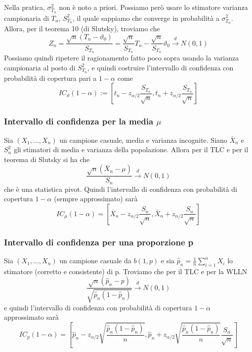 Nella pratica, $\sigma^2_{T_n}$ non è noto a priori. Possiamo però usare lo stimatore varianza campionaria di $T_n$, $S^2_{T_n}$, il quale sappiamo che converge in probabilità a $\sigma^2_{T_n}$. Allora, per il teorema 10 (di Slutsky), troviamo che 
$$Z_n=\frac{\sqrt{n}(T_n - \vartheta_0)}{S_{T_n}} = \frac{\sqrt{n}}{S_{T_n}} T_n - \frac{\sqrt{n}}{S_{T_n}} \vartheta_0 \stackrel{d}{\rightarrow}N(0,1)$$ Possiamo quindi ripetere il ragionamento fatto poco sopra usando la varianza campionaria al posto di $S^2_{T_n}$, e quindi costruire l'intervallo di confidenza con probabilità di copertura pari a $1 - \alpha$ come $$IC_\vartheta (1-\alpha) := \left[t_n - z_{\alpha / 2} \frac{S_{T_n}}{\sqrt{n}}, t_n + z_{\alpha / 2} \frac{S_{T_n}}{\sqrt{n}}\right]$$
\subsubsection{Intervallo di confidenza per la media $\mu$}
Sia $(X_1,...,X_n)$ un campione casuale, media e varianza incognite. Siano $\bar{X}_n$ e $S^2_n$ gli stimatori di media e varianza della popolazione. Allora per il TLC e per il teorema di Slutsky si ha che 
$$\frac{\sqrt{n}(\bar{X}_n - \mu)}{S_n} \stackrel{d}{\rightarrow}N(0,1)$$
che è una statistica pivot. Quindi l'intervallo di confidenza con probabilità di copertura $1-\alpha$ (sempre approssimato) sarà
$$IC_\mu(1-\alpha)=\left[\bar{X}_n - z_{\alpha / 2} \frac{S_n}{\sqrt{n}}, \bar{X}_n + z_{\alpha / 2} \frac{S_n}{\sqrt{n}}\right]$$
\subsubsection{Intervallo di confidenza per una proporzione p}
Sia $(X_1,...,X_n)$ un campione casuale da $b(1,p)$ e sia $\hat{p}_n=\frac{1}{n} \sum_{i=1}^n X_i$ lo stimatore (corretto e consistente) di p. Troviamo che per il TLC e per la WLLN $$\frac{\sqrt{n}(\hat{p}_n - p)}{\sqrt{\hat{p}_n(1-\hat{p}_n)}} \stackrel{d}{\rightarrow}N(0,1)$$
e quindi l'intervallo di confidenza con probabilità di copertura $1-\alpha$ approssimato sarà
$$IC_p(1-\alpha)=
\left[\hat{p}_n -
 z_{\alpha / 2} 
 \sqrt{\frac{\hat{p}_n(1-\hat{p}_n)}{n}},
  \hat{p}_n + z_{\alpha / 2}\sqrt{\frac{\hat{p}_n(1-\hat{p}_n)}{n}} \frac{S_n}{\sqrt{n}}\right]$$